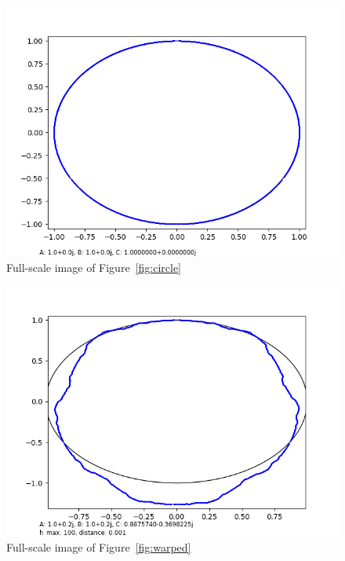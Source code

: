 \documentclass[12pt,a4paper,reqno,parskip=full]{amsart}
\numberwithin{equation}{section}
\theoremstyle{plain}
\theoremstyle{definition}
\begin{document}
\begin{figure}[H]
    \centering
    \includegraphics[width=\textwidth]{images/nn/a0 b0 h100 d0.001 auto xy.png}
    \caption{Full-scale image of Figure~\ref{fig:circle}}
\end{figure}

\begin{figure}[H]
    \centering
    \includegraphics[width=\textwidth]{images/m/a.2,b.2,h100,d.0010.png}
    \caption{Full-scale image of Figure~\ref{fig:warped}}
\end{figure}
\end{document}
